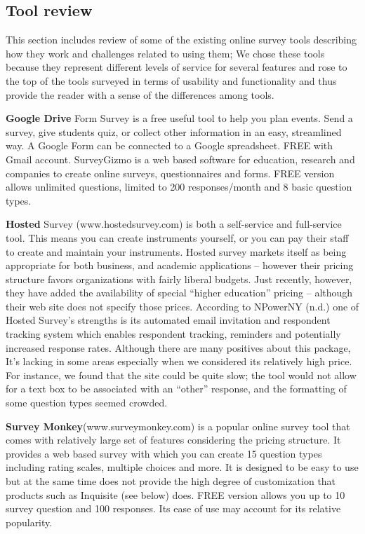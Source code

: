 \documentclass[a4paper,12pt]{article}
\begin{document}
\subsection{Tool review}
This section includes review of some of the existing online survey tools describing how they work and challenges related to using them;
We chose these tools because they represent different levels of service for several
features and rose to the top of the tools surveyed in terms of usability and functionality and thus
provide the reader with a sense of the differences among tools.
\par
{\bf Google Drive} Form Survey is a free useful tool to help you plan events. Send a survey, give students quiz, or collect other information in an easy, streamlined way. A Google Form can be connected to a Google spreadsheet. FREE with Gmail account.
SurveyGizmo is a web based software for education, research and companies to create online surveys, questionnaires and forms. FREE version allows unlimited questions, limited to 200 responses/month and 8 basic question types.
\par
{\bf Hosted} Survey (www.hostedsurvey.com) is both a self-service and full-service tool. This means
you can create instruments yourself, or you can pay their staff to create and maintain your
instruments. Hosted survey markets itself as being appropriate for both business, and academic
applications – however their pricing structure favors organizations with fairly
liberal budgets. Just recently, however, they have added the availability of special “higher education” pricing – although their web site does not specify those prices. According to
NPowerNY (n.d.) one of Hosted Survey’s strengths is its automated email invitation and
respondent tracking system which enables respondent tracking, reminders and potentially
increased response rates.
Although there are many positives about this package, It’s lacking in some areas especially when we considered its relatively high price. For instance, we found that the site could be quite slow; the tool would not allow for a text box to be associated with an “other” response, and the formatting of some question types seemed crowded.
\par
{\bf Survey Monkey}(www.surveymonkey.com) is a popular online survey tool that comes with
relatively large set of features considering the pricing structure. It provides a web based survey with which you can create 15 question types including rating scales, multiple choices and more. It is designed to be easy to use but at the same time does not provide the high degree of customization that products such as Inquisite (see below) does.  FREE version allows you up to 10 survey question and 100 responses. Its ease of use may account for its relative popularity.
\end{document}
